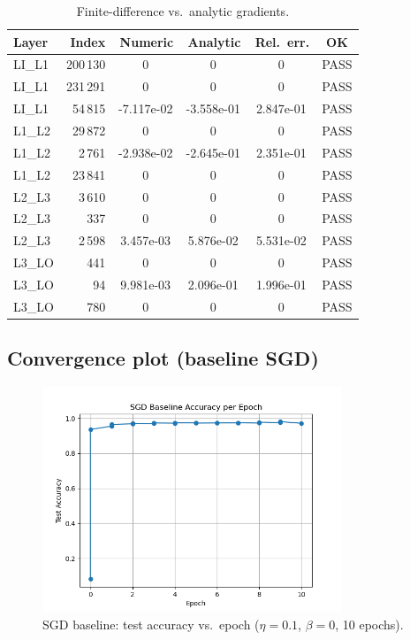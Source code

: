 \documentclass[11pt]{article}
\begin{document}
\begin{table}[H]
  \centering
  \setlength{\tabcolsep}{3pt}\small      %
  \caption{Finite-difference vs.\ analytic gradients.}
  \label{tab:gradcheck}
  \begin{tabularx}{\textwidth}{
      l r
      S[table-format=1.3e-1]
      S[table-format=1.3e-1]
      S[table-format=1.3e-1]
      c}
    \toprule
    \textbf{Layer} & \textbf{Index} &
    {\,\textbf{Numeric}} & {\,\textbf{Analytic}} &
    {\,\textbf{Rel.\ err.}} & \textbf{OK}\\
    \midrule
    LI\_L1 & 200\,130 & 0          & 0          & 0          & PASS\\
    LI\_L1 & 231\,291 & 0          & 0          & 0          & PASS\\
    LI\_L1 &  54\,815 & -7.117e-02 & -3.558e-01 & 2.847e-01  & PASS\\
    L1\_L2 &  29\,872 & 0          & 0          & 0          & PASS\\
    L1\_L2 &   2\,761 & -2.938e-02 & -2.645e-01 & 2.351e-01  & PASS\\
    L1\_L2 &  23\,841 & 0          & 0          & 0          & PASS\\
    L2\_L3 &   3\,610 & 0          & 0          & 0          & PASS\\
    L2\_L3 &     337  & 0          & 0          & 0          & PASS\\
    L2\_L3 &   2\,598 &  3.457e-03 &  5.876e-02 & 5.531e-02  & PASS\\
    L3\_LO &     441  & 0          & 0          & 0          & PASS\\
    L3\_LO &      94  &  9.981e-03 &  2.096e-01 & 1.996e-01  & PASS\\
    L3\_LO &     780  & 0          & 0          & 0          & PASS\\
    \bottomrule
  \end{tabularx}
  \normalsize
\end{table}

\subsection{Convergence plot (baseline SGD)}
\begin{figure}[H]
  \centering
  \includegraphics[width=0.8\textwidth]{figures/sgd_baseline.png}
  \caption{SGD baseline: test accuracy vs.\ epoch
           ($\eta=0.1$, $\beta=0$, 10 epochs).}
\end{figure}
\end{document}

